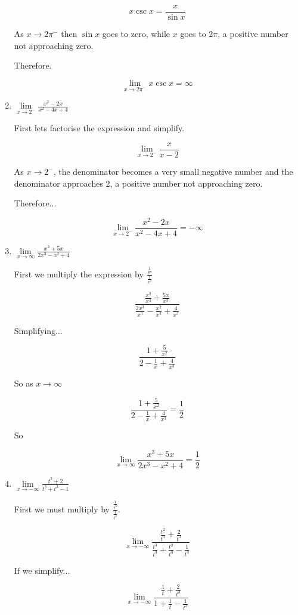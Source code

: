 \documentclass{article}
\begin{document}
\begin{enumerate}
			$$x \csc x = \frac{x}{\sin x}$$

			As $x \to 2\pi^{-}$ then $\sin x$ goes to zero, while
			$x$ goes to $2\pi$, a positive number not approaching zero.

			Therefore.

			$$\lim \limits _{x \to 2\pi^{-}} x \csc x = \infty$$

		\item $\lim \limits _{x \to 2^{-}} \frac{x^2 - 2x}{x^2 -4x + 4}$

			First lets factorise the expression and simplify.

			$$\lim \limits _{x \to 2^{-}} \frac{x}{x-2}$$

			As $x \to 2^{-}$, the denominator becomes a very small
			negative number and the denominator approaches 2, a positive
			number not approaching zero.

			Therefore...

			$$\lim \limits _{x \to 2^{-}} \frac{x^2 - 2x}{x^2 -4x + 4} = -\infty$$

		\item $\lim \limits _{x \to \infty} \frac{x^3 + 5x}{2x^3-x^2+4}$

			First we multiply the expression by $\frac{\frac{1}{x^3}}{\frac{1}{x^3}}$

			$$\frac{ \frac{x^3}{x^3} + \frac{5x}{x^3}}{ \frac{2x^3}{x^3} - \frac{x^2}{x^3} + \frac{4}{x^3}}$$

			Simplifying...

			$$\frac{1 + \frac{5}{x^2}}{2 - \frac{1}{x} + \frac{4}{x^3}}$$

			So as $x \to \infty$

			$$\frac{1 + \frac{5}{x^2}}{2 - \frac{1}{x} + \frac{4}{x^3}} = \frac{1}{2}$$

			So

			$$\lim \limits _{x \to \infty} \frac{x^3 + 5x}{2x^3-x^2+4} = \frac{1}{2}$$

		\item $\lim \limits _{x \to -\infty} \frac{t^2 + 2}{t^3 + t^2 - 1}$

			First we must multiply by $\frac{\frac{1}{t^3}}{\frac{1}{t^3}}$.

			$$\lim \limits _{x \to -\infty} \frac{\frac{t^2}{t^3} + \frac{2}{t^3}}{\frac{t^3}{t^3} + \frac{t^2}{t^3} - \frac{1}{t^3}}$$

			If we simplify...

			$$\lim \limits _{x \to -\infty} \frac{\frac{1}{t} + \frac{2}{t^3}}{1 + \frac{1}{t} - \frac{1}{t^3}}$$


\end{enumerate}
\end{document}
